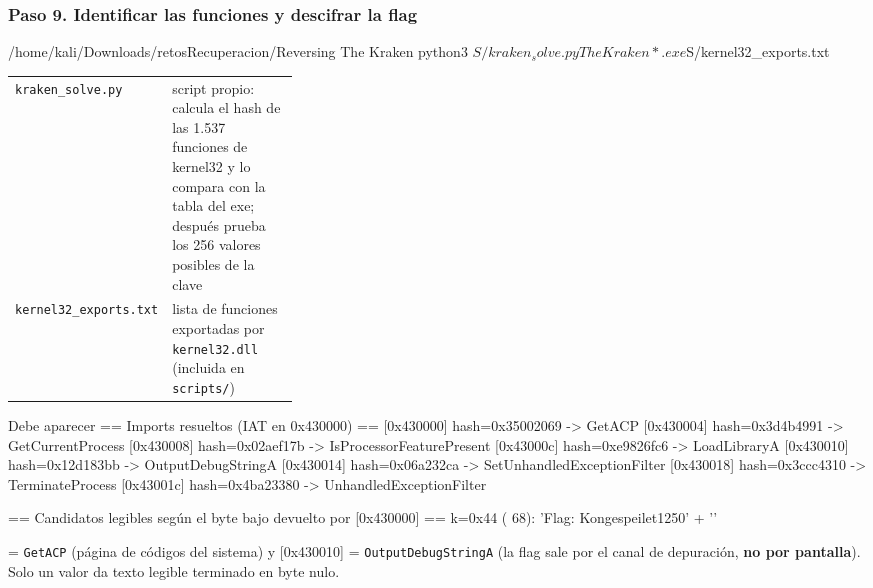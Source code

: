 \documentclass[11pt,a4paper]{article}
\begin{document}
\subsubsection*{Paso 9. Identificar las funciones y descifrar la flag}
\begin{comando}{/home/kali/Downloads/retosRecuperacion/Reversing The Kraken}
python3 $S/kraken_solve.py TheKraken*.exe $S/kernel32_exports.txt
\end{comando}
\begin{tcolorbox}[enhanced, breakable, colback=gray!3, colframe=gray!35, boxrule=0.3pt, arc=1pt, left=4pt, right=4pt, top=2pt, bottom=2pt, fonttitle=\sffamily\scriptsize\bfseries, coltitle=black!70, colbacktitle=gray!10, title={Qué hace cada parte}, attach title to upper, before skip=2pt, after skip=4pt, fontupper=\small]
\par{\renewcommand{\arraystretch}{1.12}\begin{tabularx}{\linewidth}{@{}>{\raggedright\arraybackslash}p{0.33\linewidth}>{\raggedright\arraybackslash}X@{}}
\texttt{kraken\_\allowbreak{}solve.py} & script propio: calcula el hash de las 1.537 funciones de kernel32 y lo compara con la tabla del exe; después prueba los 256 valores posibles de la clave \\
\texttt{kernel32\_\allowbreak{}exports.txt} & lista de funciones exportadas por \texttt{kernel32.dll} (incluida en \texttt{scripts/}) \\
\end{tabularx}}
\end{tcolorbox}
\begin{salida}{Debe aparecer}
== Imports resueltos (IAT en 0x430000) ==
  [0x430000]  hash=0x35002069  ->  GetACP
  [0x430004]  hash=0x3d4b4991  ->  GetCurrentProcess
  [0x430008]  hash=0x02aef17b  ->  IsProcessorFeaturePresent
  [0x43000c]  hash=0xe9826fc6  ->  LoadLibraryA
  [0x430010]  hash=0x12d183bb  ->  OutputDebugStringA
  [0x430014]  hash=0x06a232ca  ->  SetUnhandledExceptionFilter
  [0x430018]  hash=0x3ccc4310  ->  TerminateProcess
  [0x43001c]  hash=0x4ba23380  ->  UnhandledExceptionFilter

== Candidatos legibles según el byte bajo devuelto por [0x430000] ==
  k=0x44 ( 68): 'Flag: Kongespeilet1250' + ''
\end{salida}
\begin{nota}[0x430000] = \texttt{GetACP} (página de códigos del sistema) y [0x430010] = \texttt{OutputDebugStringA} (la flag sale por el canal de depuración, \textbf{no por pantalla}). Solo un valor da texto legible terminado en byte nulo.\end{nota}
\end{document}
